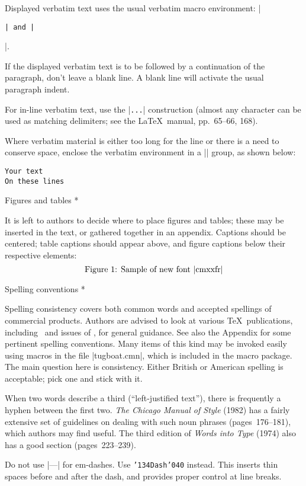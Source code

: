 Displayed verbatim text uses the usual verbatim macro environment:
|\begin{verbatim}| and |\end{verbatim}|.

If the displayed verbatim text is to be followed by a continuation of the
paragraph, don't leave a blank line.  A blank line will activate the
usual paragraph indent.

For in-line verbatim text, use the |\verb+...+| construction (almost any
character can be used as matching delimiters; see the \LaTeX\ manual,
pp.\ 65--66, 168).

Where verbatim material is either too long for the line or there is a
need to conserve space, enclose the verbatim environment in a |\small|
group, as shown below:

\verbatim
{\small
\begin{verbatim}
Your text
On these lines
\end{verbatim}
}
\endverbatim

\subhead * Figures and tables *

It is left to authors to decide where to place figures and tables; these
may be inserted in the text, or gathered together in an appendix.
Captions should be centered; table captions should appear above, and
figure captions below their respective elements:
$$
   \hbox{Figure~1: Sample of new font |cmxxfr|}
$$

\subhead * Spelling conventions *

Spelling consistency covers both common words and accepted spellings of
commercial products.  Authors are advised to look at various \TeX\
publications, including \TB\ and issues of \TUB, for general guidance.
See also the Appendix for some pertinent spelling conventions.  Many
items of this kind may be invoked easily using macros in the file
|tugboat.cmn|, which is included in the macro package.  The main
question here is consistency.  Either British or American spelling is
acceptable; pick one and stick with it.

When two words describe a third (``left-justified text''), there is
frequently a hyphen between the first two.  {\sl The Chicago Manual of
Style\/} (1982) has a fairly extensive set of guidelines on dealing with
such noun phrases (pages~176--181), which authors may find useful.
The third edition of {\sl Words into Type\/} (1974) also has a good
section (pages~223--239).

Do not use |---| for em-dashes.  Use {\tt\char'134{Dash}\char'040}
instead.  This inserts thin spaces before and after the dash, and
provides proper control at line breaks.

